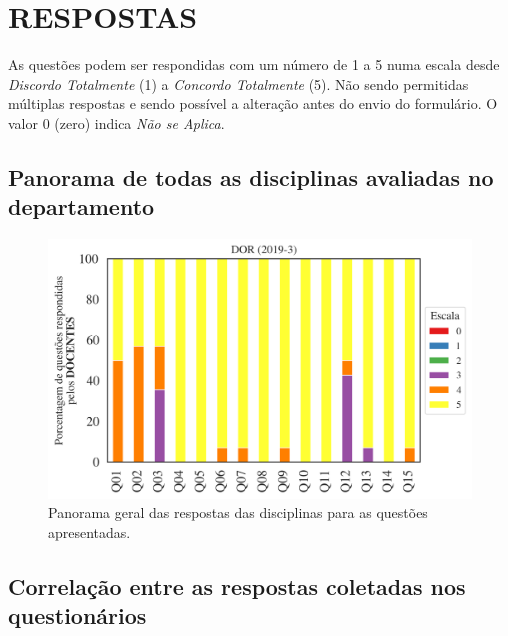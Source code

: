 \documentclass[a4paper,10pt]{article}
\begin{document}
\section{RESPOSTAS}
As questões podem ser respondidas com um número de 1 a 5 numa escala desde {\it Discordo Totalmente} (1) a {\it Concordo Totalmente} (5). Não sendo permitidas múltiplas respostas e sendo possível a alteração antes do envio do formulário. O valor 0 (zero) indica {\it Não se Aplica}.

\subsection{Panorama de todas as disciplinas avaliadas no departamento}
\begin{figure}[h]
\centering
\includegraphics[width=0.85\linewidth]{analise_geral_departamento_DOR_docentes.png}
\caption{\label{fig:analise_geral_departamento}            Panorama geral das respostas das disciplinas para as questões apresentadas.}
\end{figure}
\subsection{Correlação entre as respostas coletadas nos questionários}
\end{document}
